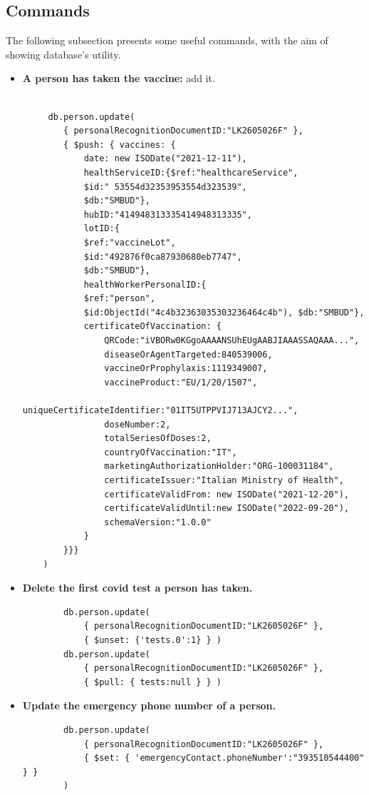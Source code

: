 \documentclass{article}[IEEEtran]
\begin{document}
\newpage 

\subsection{Commands}

The following subsection presents some useful commands, with the aim of showing database’s utility.

\begin{itemize}
    \item \textbf{A person has taken the vaccine:} add it.
    
    \begin{lstlisting}

     db.person.update(
    	{ personalRecognitionDocumentID:"LK2605026F" },
    	{ $push: { vaccines: {
            date: new ISODate("2021-12-11"),
            healthServiceID:{$ref:"healthcareService",
            $id:" 53554d32353953554d323539", 
            $db:"SMBUD"},
            hubID:"414948313335414948313335",
            lotID:{ 
            $ref:"vaccineLot",
            $id:"492876f0ca87930680eb7747", 
            $db:"SMBUD"},
            healthWorkerPersonalID:{
            $ref:"person",
            $id:ObjectId("4c4b32363035303236464c4b"), $db:"SMBUD"},
            certificateOfVaccination: {
                QRCode:"iVBORw0KGgoAAAANSUhEUgAABJIAAASSAQAAA...",
                diseaseOrAgentTargeted:840539006,
                vaccineOrProphylaxis:1119349007,
                vaccineProduct:"EU/1/20/1507",
                uniqueCertificateIdentifier:"01IT5UTPPVIJ713AJCY2...",
                doseNumber:2,
                totalSeriesOfDoses:2,
                countryOfVaccination:"IT",
                marketingAuthorizationHolder:"ORG-100031184",
                certificateIssuer:"Italian Ministry of Health",
                certificateValidFrom: new ISODate("2021-12-20"),
                certificateValidUntil:new ISODate("2022-09-20"),
                schemaVersion:"1.0.0"
            }
        }}}
    )
        \end{lstlisting}
        
        \item \textbf{Delete the first covid test a person has taken.}
         \begin{lstlisting}
        db.person.update( 
            { personalRecognitionDocumentID:"LK2605026F" }, 
            { $unset: {'tests.0':1} } )
        db.person.update( 
            { personalRecognitionDocumentID:"LK2605026F" }, 
            { $pull: { tests:null } } )
        \end{lstlisting}
        
        \item \textbf{Update the emergency phone number of a person.}
         \begin{lstlisting}
        db.person.update(
            { personalRecognitionDocumentID:"LK2605026F" },
            { $set: { 'emergencyContact.phoneNumber':"393510544400" } }
        )
        \end{lstlisting}
 \end{itemize}
\end{document}
